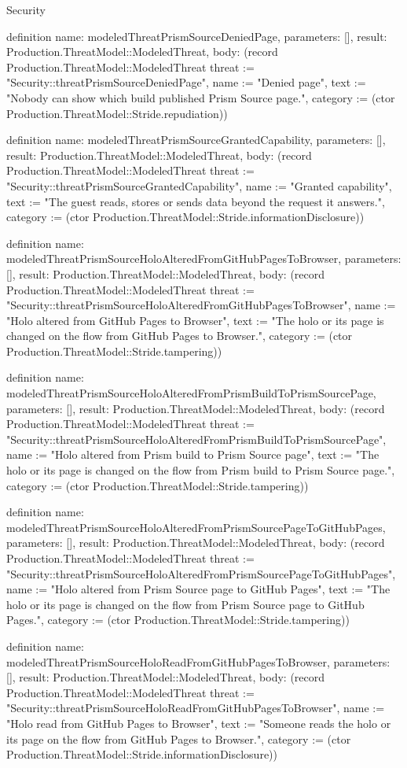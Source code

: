 \begin{lexlean}{Security}
\begin{semanticmodule}
definition{
  name: modeledThreatPrismSourceDeniedPage,
  parameters: [],
  result: Production.ThreatModel::ModeledThreat,
  body: (record Production.ThreatModel::ModeledThreat {threat := "Security::threatPrismSourceDeniedPage", name := "Denied page", text := "Nobody can show which build published Prism Source page.", category := (ctor Production.ThreatModel::Stride.repudiation)})
}

definition{
  name: modeledThreatPrismSourceGrantedCapability,
  parameters: [],
  result: Production.ThreatModel::ModeledThreat,
  body: (record Production.ThreatModel::ModeledThreat {threat := "Security::threatPrismSourceGrantedCapability", name := "Granted capability", text := "The guest reads, stores or sends data beyond the request it answers.", category := (ctor Production.ThreatModel::Stride.informationDisclosure)})
}

definition{
  name: modeledThreatPrismSourceHoloAlteredFromGitHubPagesToBrowser,
  parameters: [],
  result: Production.ThreatModel::ModeledThreat,
  body: (record Production.ThreatModel::ModeledThreat {threat := "Security::threatPrismSourceHoloAlteredFromGitHubPagesToBrowser", name := "Holo altered from GitHub Pages to Browser", text := "The holo or its page is changed on the flow from GitHub Pages to Browser.", category := (ctor Production.ThreatModel::Stride.tampering)})
}

definition{
  name: modeledThreatPrismSourceHoloAlteredFromPrismBuildToPrismSourcePage,
  parameters: [],
  result: Production.ThreatModel::ModeledThreat,
  body: (record Production.ThreatModel::ModeledThreat {threat := "Security::threatPrismSourceHoloAlteredFromPrismBuildToPrismSourcePage", name := "Holo altered from Prism build to Prism Source page", text := "The holo or its page is changed on the flow from Prism build to Prism Source page.", category := (ctor Production.ThreatModel::Stride.tampering)})
}

definition{
  name: modeledThreatPrismSourceHoloAlteredFromPrismSourcePageToGitHubPages,
  parameters: [],
  result: Production.ThreatModel::ModeledThreat,
  body: (record Production.ThreatModel::ModeledThreat {threat := "Security::threatPrismSourceHoloAlteredFromPrismSourcePageToGitHubPages", name := "Holo altered from Prism Source page to GitHub Pages", text := "The holo or its page is changed on the flow from Prism Source page to GitHub Pages.", category := (ctor Production.ThreatModel::Stride.tampering)})
}

definition{
  name: modeledThreatPrismSourceHoloReadFromGitHubPagesToBrowser,
  parameters: [],
  result: Production.ThreatModel::ModeledThreat,
  body: (record Production.ThreatModel::ModeledThreat {threat := "Security::threatPrismSourceHoloReadFromGitHubPagesToBrowser", name := "Holo read from GitHub Pages to Browser", text := "Someone reads the holo or its page on the flow from GitHub Pages to Browser.", category := (ctor Production.ThreatModel::Stride.informationDisclosure)})
}


\end{semanticmodule}
\end{lexlean}
